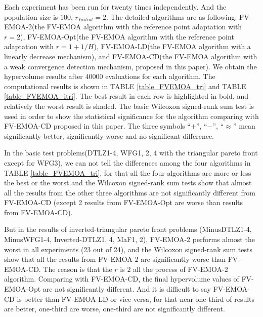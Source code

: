 \documentclass[conference]{IEEEtran}
\begin{document}
Each experiment has been run for twenty times independently. 
And the population size is $100$, $r_{Initial}=2$.
The detailed algorithms are as following: 
FV-EMOA-2(the FV-EMOA\cite{FVEMOA} algorithm with the reference point adaptation with $r=2$),
FV-EMOA-Opt(the FV-EMOA algorithm with the reference point adaptation with $r=1+1/H$),
FV-EMOA-LD(the FV-EMOA algorithm with a linearly decrease mechanism),
and FV-EMOA-CD(the FV-EMOA algorithm with a weak convergence detection mechanism, proposed in this paper).
We obtain the hypervolume results after $40000$ evaluations for each algorithm. 
The computational results is shown in TABLE \ref{table_FVEMOA_tri} and TABLE \ref{table_FVEMOA_itri}. 
The best result in each row is highlighted in bold, and relatively the worst result is shaded. 
The basic Wilcoxon signed-rank sum test is used in order to show the statistical significance for the algorithm
comparing with FV-EMOA-CD proposed in this paper. The three symbols ``$+$'', ``$-$'', ``$\approx$'' 
mean significantly better, significantly worse and no significant difference.

In the basic test problems(DTLZ1-4, WFG1, 2, 4 with the triangular pareto front except for WFG3), 
we can not tell the differences among the four algorithms in TABLE \ref{table_FVEMOA_tri},
for that all the four algorithms are more or less the best or the worst 
and the Wilcoxon signed-rank sum tests show that almost all the results from the other three algorithms are not significantly different from FV-EMOA-CD
(except 2 results from FV-EMOA-Opt are worse than results from FV-EMOA-CD). 

But in the results of inverted-triangular pareto front problems (MinusDTLZ1-4, MinusWFG1-4, Inverted-DTLZ1, 4, MaF1, 2), 
FV-EMOA-2 performs almost the worst in all experiments (23 out of 24), 
and the Wilcoxon signed-rank sum tests show that all the results from FV-EMOA-2 are significantly worse than FV-EMOA-CD. 
The reason is that the $r$ is $2$ all the process of FV-EMOA-2 algorithm. 
Comparing with FV-EMOA-CD, the final hypervolume values of FV-EMOA-Opt are not significantly different. 
And it is difficult to say FV-EMOA-CD is better than FV-EMOA-LD or vice versa,
for that near one-third of results are better, one-third are worse, one-third are not significantly different. 

% 
\end{document}
